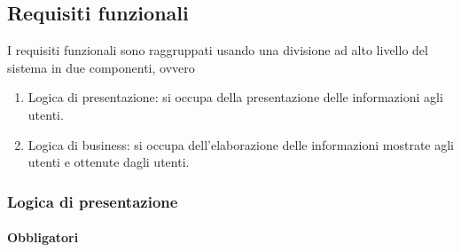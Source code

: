 \subsection{Requisiti funzionali}
\label{subsec:requisiti_funzionali}
I requisiti funzionali sono raggruppati usando una divisione ad alto livello del sistema in due componenti, ovvero 
\begin{enumerate}
    \item Logica di presentazione: si occupa della presentazione delle informazioni agli utenti.
    \item Logica di business: si occupa dell'elaborazione delle informazioni mostrate agli utenti e ottenute dagli utenti.
\end{enumerate}

\subsubsection{Logica di presentazione}

\paragraph{Obbligatori}

